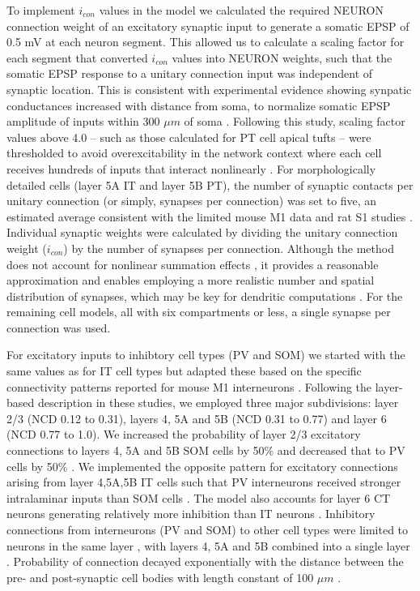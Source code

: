 To implement $i_{con}$ values in the model we calculated the required NEURON connection weight of an excitatory synaptic input to generate a somatic EPSP of 0.5 mV at each neuron segment. This allowed us to calculate a scaling factor for each segment that converted $i_{con}$ values into NEURON weights, such that the somatic EPSP response to a unitary connection input was independent of synaptic location. This is consistent with experimental evidence showing synpatic conductances increased with distance from soma, to normalize somatic EPSP amplitude of inputs within 300 $\mu m$ of soma \cite{Mage00}. Following this study, scaling factor values above 4.0 -- such as those calculated for PT cell apical tufts -- were thresholded to avoid overexcitability in the network context where each cell receives hundreds of inputs that interact nonlinearly \cite{Spru08,Beha12}. For morphologically detailed cells (layer 5A IT and layer 5B PT), the number of synaptic contacts per unitary connection (or simply, synapses per connection) was set to five, an estimated average consistent with the limited mouse M1 data \cite{HuAg16} and rat S1 studies \cite{Brun06,Mark15}. Individual synaptic weights were calculated by dividing the unitary connection weight ($i_{con}$) by the number of synapses per connection. Although the method does not account for nonlinear summation effects \cite{Spru08}, it provides a reasonable approximation and enables employing a more realistic number and spatial distribution of synapses, which may be key for dendritic computations \cite{Lond05}. For the remaining cell models, all with six compartments or less, a single synapse per connection was used. 

For excitatory inputs to inhibtory cell types (PV and SOM) we started with the same values as for IT cell types but adapted these based on the  specific connectivity patterns reported for mouse M1 interneurons \cite{Apic12,Yama15b} . Following the layer-based description in these studies, we employed three major subdivisions: layer 2/3 (NCD 0.12 to 0.31), layers 4, 5A and 5B (NCD 0.31 to 0.77) and layer 6 (NCD 0.77 to 1.0).  
We increased the probability of layer 2/3 excitatory connections to layers 4, 5A and 5B SOM cells by 50\% and decreased that to PV cells by 50\% \cite{Apic12}. We implemented the opposite pattern for excitatory connections arising from layer 4,5A,5B IT cells such that PV interneurons received stronger intralaminar inputs than SOM cells \cite{Apic12}. The model also accounts for layer 6 CT neurons generating relatively more inhibition than IT neurons \cite{Yama15b}. Inhibitory connections from interneurons (PV and SOM) to other cell types were limited to neurons in the same layer \cite{Katz11}, with layers 4, 5A and 5B combined into a single layer \cite{Naka16}. Probability of connection decayed exponentially with the distance between the pre- and post-synaptic cell bodies with length constant of 100 $\mu m$ \cite{GalL17,Fino11}.

